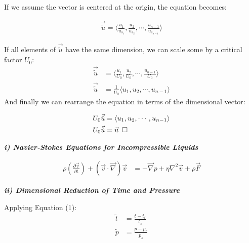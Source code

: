 \documentclass[titlepage]{article}
\begin{document}
    \noindent If we assume the vector is centered at the origin, the equation becomes: 

    \begin{align}
        \vec{\tilde{u}}=\langle{\displaystyle\frac{u_{1}}{u_{s_{1}}}, \displaystyle\frac{u_{2}}{u_{s_{2}}}, \cdots, \displaystyle\frac{u_{n-1}}{u_{s_{n-1}}}}\rangle
    \end{align}

    \noindent If all  elements of $\vec{\tilde{u}}$ have the same dimension, we can scale some by a critical factor $U_{0}$:
    \begin{align}
        \vec{\tilde{u}} &= \langle{\displaystyle\frac{u_{1}}{U_{0}}, \displaystyle\frac{u_{2}}{U_{0}}, \cdots, \displaystyle\frac{u_{n-1}}{U_{0}}}\rangle \\
        \vec{\tilde{u}} &= \displaystyle\frac{1}{U_{0}}\langle{u_{1}, u_{2}, \cdots, u_{n-1}}\rangle
    \end{align}
    \noindent And finally we can rearrange the equation in terms of the dimensional vector: 

    \begin{align}
        U_{0}\vec{\tilde{u}} &= \langle{u_{1}, u_{2}, \cdots, u_{n-1}}\rangle \\
        U_{0}\vec{\tilde{u}} &= \vec{u}\hspace*{5pt}\square
    \end{align}

    \newpage

    \begin{center}
        \textbf{\emph{i) Navier-Stokes Equations for Incompressible Liquids}}
    \end{center}
    \begin{align}
        \rho\left(\displaystyle\frac{\partial\vec{v}}{\partial{t}}\right)+\left(\vec{v}\cdot\vec{\nabla}\right)\vec{v} &= -\vec{\nabla}p+\eta\nabla^2\vec{v}+\rho\vec{F}
    \end{align}

    \begin{center}
        \textbf{\emph{ii) Dimensional Reduction of Time and Pressure}}
    \end{center}

    Applying Equation (1):
    \begin{align}
        \tilde{t}  &=  \displaystyle\frac{t-t_{r}}{t_{s}} \\
        \tilde{p}  &=  \displaystyle\frac{p-p_{r}}{p_{s}}
    \end{align}
\end{document}
